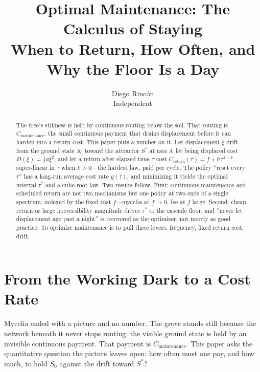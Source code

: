 \documentclass[12pt]{article}
\title{Optimal Maintenance: The Calculus of Staying\\
\large When to Return, How Often, and Why the Floor Is a Day}
\author{Diego Rincón\\
\small Independent}
\date{}
\begin{document}
\maketitle

\begin{abstract}
The tree's stillness is held by continuous routing below the soil. That routing is $C_{\text{maintenance}}$: the small continuous payment that drains displacement before it can harden into a return cost. This paper puts a number on it. Let displacement $\xi$ drift from the ground state $S_0$ toward the attractor $S^*$ at rate $\delta$, let being displaced cost $D(\xi)=\tfrac{1}{2}a\xi^2$, and let a return after elapsed time $\tau$ cost $C_{\text{return}}(\tau)=f+b\,\tau^{1+k}$, super-linear in $\tau$ when $k>0$---the hardest law, paid per cycle. The policy ``reset every $\tau$'' has a long-run average cost rate $g(\tau)$, and minimizing it yields the optimal interval $\tau^*$ and a cube-root law. Two results follow. First: continuous maintenance and scheduled return are not two mechanisms but one policy at two ends of a single spectrum, indexed by the fixed cost $f$---mycelia at $f\to 0$, Ise at $f$ large. Second: cheap return or large irreversibility magnitude drives $\tau^*$ to the cascade floor, and ``never let displacement age past a night'' is recovered as the optimizer, not merely as good practice. To optimize maintenance is to pull three levers: frequency, fixed return cost, drift.
\end{abstract}

\section{From the Working Dark to a Cost Rate}

Mycelia ended with a picture and no number. The grove stands still because the network beneath it never stops routing; the visible ground state is held by an invisible continuous payment. That payment is $C_{\text{maintenance}}$. This paper asks the quantitative question the picture leaves open: how often must one pay, and how much, to hold $S_0$ against the drift toward $S^*$?
\end{document}
